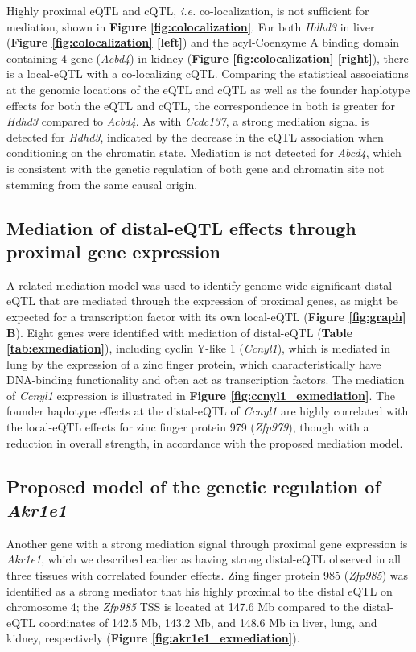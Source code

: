 Highly proximal eQTL and cQTL, \textit{i.e.} co-localization, is not sufficient for mediation, shown in \textbf{Figure \ref{fig:colocalization}}. For both \textit{Hdhd3} in liver (\textbf{Figure \ref{fig:colocalization} [left]}) and the acyl-Coenzyme A binding domain containing 4 gene (\textit{Acbd4}) in kidney (\textbf{Figure \ref{fig:colocalization} [right]}), there is a local-eQTL with a co-localizing cQTL. Comparing the statistical associations at the genomic locations of the eQTL and cQTL as well as the founder haplotype effects for both the eQTL and cQTL, the correspondence in both is greater for \textit{Hdhd3} compared to \textit{Acbd4}. As with \textit{Ccdc137}, a strong mediation signal is detected for \textit{Hdhd3}, indicated by the decrease in the eQTL association when conditioning on the chromatin state. Mediation is not detected for \textit{Abcd4}, which is consistent with the genetic regulation of both gene and chromatin site not stemming from the same causal origin.

\subsection{Mediation of distal-eQTL effects through proximal gene expression}

A related mediation model was used to identify genome-wide significant distal-eQTL that are mediated through the expression of proximal genes, as might be expected for a transcription factor with its own local-eQTL (\textbf{Figure \ref{fig:graph} B}). Eight genes were identified with mediation of distal-eQTL (\textbf{Table \ref{tab:exmediation}}), including cyclin Y-like 1 (\textit{Ccnyl1}), which is mediated in lung by the expression of a zinc finger protein, which characteristically have DNA-binding functionality and often act as transcription factors. The mediation of \textit{Ccnyl1} expression is illustrated in \textbf{Figure \ref{fig:ccnyl1_exmediation}}. The founder haplotype effects at the distal-eQTL of \textit{Ccnyl1} are highly correlated with the local-eQTL effects for zinc finger protein 979 (\textit{Zfp979}), though with a reduction in overall strength, in accordance with the proposed mediation model.

\subsection{Proposed model of the genetic regulation of \textit{Akr1e1}}

Another gene with a strong mediation signal through proximal gene expression is \textit{Akr1e1}, which we described earlier as having strong distal-eQTL observed in all three tissues with correlated founder effects. Zing finger protein 985 (\textit{Zfp985}) was identified as a strong mediator that his highly proximal to the distal eQTL on chromosome 4; the \textit{Zfp985} TSS is located at 147.6 Mb compared to the distal-eQTL coordinates of 142.5 Mb, 143.2 Mb, and 148.6 Mb in liver, lung, and kidney, respectively (\textbf{Figure \ref{fig:akr1e1_exmediation}}).

